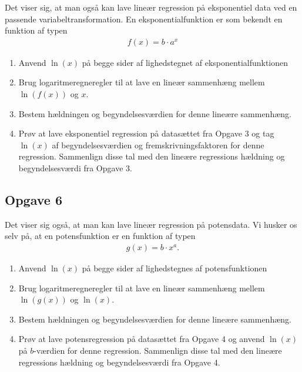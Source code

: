Det viser sig, at man også kan lave lineær regression på eksponentiel data ved en passende variabeltransformation. En eksponentialfunktion er som bekendt en funktion af typen
\begin{align*}
	f(x) = b\cdot a^x
\end{align*}
\begin{enumerate}[label=\roman*)]
	\item Anvend $\ln(x)$ på begge sider af lighedstegnet af eksponentialfunktionen
	\item Brug logaritmeregneregler til at lave en lineær sammenhæng mellem $\ln(f(x))$ og $x$. 
	\item Bestem hældningen og begyndelsesværdien for denne lineære sammenhæng.
	\item Prøv at lave eksponentiel regression på datasættet fra Opgave 3 og tag $\ln(x)$ af begyndelsesværdien og fremskrivningsfaktoren for denne regression. Sammenlign disse tal med den lineære regressions hældning og begyndelsesværdi fra Opgave 3.
\end{enumerate}

\subsection*{Opgave 6}
Det viser sig også, at man kan lave lineær regression på potensdata. Vi husker os selv på, at en potensfunktion er en funktion af typen
\begin{align*}
	g(x) = b\cdot x^a.
\end{align*}

\begin{enumerate}[label=\roman*)]
	\item Anvend $\ln(x)$ på begge sider af lighedstegnes af potensfunktionen
	\item Brug logaritmeregneregler til at lave en lineær sammenhæng mellem $\ln(g(x))$ og $\ln(x)$.
	\item Bestem hældningen og begyndelsesværdien for denne lineære sammenhæng.
	\item Prøv at lave potensregression på datasættet fra Opgave 4 og anvend $\ln(x)$ på $b$-værdien for denne regression. Sammenlign disse tal med den lineære regressions hældning og begyndelsesværdi fra Opgave 4.
\end{enumerate}


